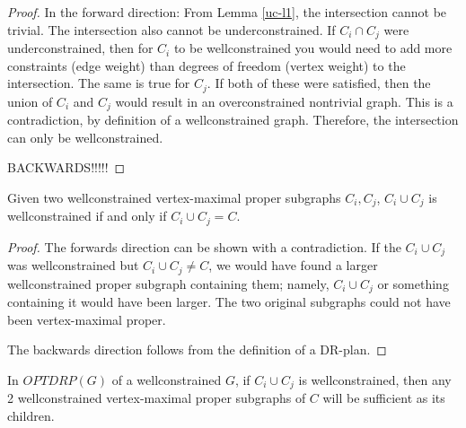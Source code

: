 \documentclass[11pt]{article}
\begin{document}
\begin{proof}
In the forward direction: From Lemma \ref{uc-l1}, the intersection cannot be trivial. The intersection also cannot be underconstrained. If $C_i \cap C_j$ were underconstrained, then for $C_i$ to be wellconstrained you would need to add more constraints (edge weight) than degrees of freedom (vertex weight) to the intersection. The same is true for $C_j$. If both of these were satisfied, then the union of $C_i$ and $C_j$ would result in an overconstrained nontrivial graph. This is a contradiction, by definition of a wellconstrained graph. Therefore, the intersection can only be wellconstrained.

BACKWARDS!!!!!
\end{proof}

\begin{lemma}\label{wc-l2}
Given two wellconstrained vertex-maximal proper subgraphs $C_i, C_j$, $C_i\cup C_j$ is wellconstrained if and only if $C_i\cup C_j = C$.
\end{lemma}

\begin{proof}
The forwards direction can be shown with a contradiction. If the $C_i\cup C_j$ was wellconstrained but $C_i\cup C_j \neq C$, we would have found a larger wellconstrained proper subgraph containing them; namely, $C_i\cup C_j$ or something containing it would have been larger. The two original subgraphs could not have been vertex-maximal proper.

The backwards direction follows from the definition of a DR-plan.
\end{proof}

\begin{theorem}\label{wc-t1}

In $OPTDRP(G)$ of a wellconstrained $G$, if $C_i \cup C_j$ is wellconstrained, then any 2 wellconstrained vertex-maximal proper subgraphs of $C$ will be sufficient as its children.
\end{theorem}
\end{document}
